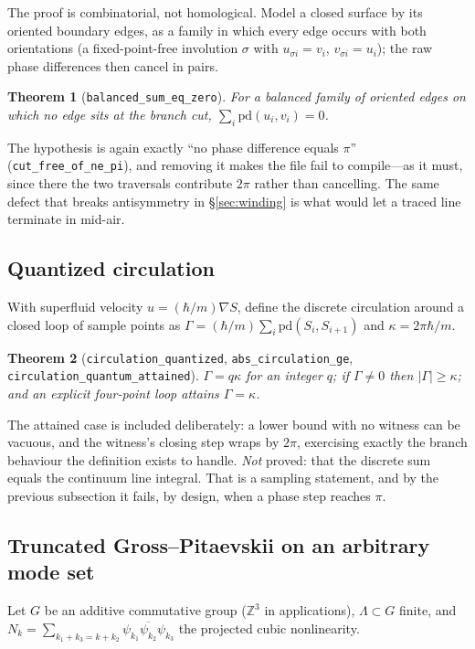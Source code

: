 \documentclass[11pt,a4paper]{article}
\newtheorem{theorem}{Theorem}
\theoremstyle{definition}
\newcommand{\conj}[1]{\overline{#1}}
\newcommand{\lean}[1]{\texttt{\small #1}}
\begin{document}
The proof is combinatorial, not homological. Model a closed surface by its oriented boundary edges,
as a family in which every edge occurs with both orientations (a fixed-point-free involution $\sigma$
with $u_{\sigma i} = v_i$, $v_{\sigma i} = u_i$); the raw phase differences then cancel in pairs.

\begin{theorem}[\lean{balanced\_sum\_eq\_zero}]
For a balanced family of oriented edges on which no edge sits at the branch cut,
$\sum_i \mathrm{pd}(u_i, v_i) = 0$.
\end{theorem}
The hypothesis is again exactly ``no phase difference equals $\pi$''
(\lean{cut\_free\_of\_ne\_pi}), and removing it makes the file fail to compile---as it must, since
there the two traversals contribute $2\pi$ rather than cancelling. The same defect that breaks
antisymmetry in \S\ref{sec:winding} is what would let a traced line terminate in mid-air.

\subsection{Quantized circulation}

With superfluid velocity $u=(\hbar/m)\nabla S$, define the discrete circulation around a
closed loop of sample points as $\Gamma = (\hbar/m)\sum_i \mathrm{pd}(S_i,S_{i+1})$ and
$\kappa = 2\pi\hbar/m$.

\begin{theorem}[\lean{circulation\_quantized}, \lean{abs\_circulation\_ge},
\lean{circulation\_quantum\_attained}]
$\Gamma = q\kappa$ for an integer $q$; if $\Gamma\neq0$ then $|\Gamma|\ge\kappa$; and an
explicit four-point loop attains $\Gamma=\kappa$.
\end{theorem}
The attained case is included deliberately: a lower bound with no witness can be vacuous,
and the witness's closing step wraps by $2\pi$, exercising exactly the branch behaviour the
definition exists to handle. \emph{Not} proved: that the discrete sum equals the continuum
line integral. That is a sampling statement, and by the previous subsection it fails, by
design, when a phase step reaches $\pi$.

\subsection{Truncated Gross--Pitaevskii on an arbitrary mode set}

Let $G$ be an additive commutative group ($\mathbb{Z}^3$ in applications), $\Lambda\subset G$
finite, and $N_k=\sum_{k_1+k_3=k+k_2}\psi_{k_1}\conj{\psi_{k_2}}\psi_{k_3}$ the projected cubic
nonlinearity.
\end{document}
